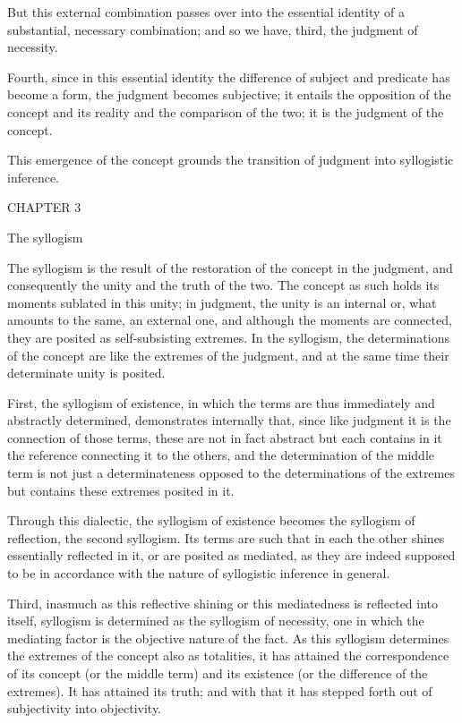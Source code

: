 But this external combination passes over
into the essential identity of a substantial, necessary combination;
and so we have, third, the judgment of necessity.

Fourth, since in this essential identity
the difference of subject and predicate has become a form,
the judgment becomes subjective;
it entails the opposition of the concept and its reality
and the comparison of the two;
it is the judgment of the concept.

This emergence of the concept grounds
the transition of judgment into syllogistic inference.

CHAPTER 3

The syllogism

The syllogism is the result of
the restoration of the concept in the judgment,
and consequently the unity and the truth of the two.
The concept as such holds its moments
sublated in this unity;
in judgment, the unity is an internal
or, what amounts to the same, an external one,
and although the moments are connected,
they are posited as self-subsisting extremes.
In the syllogism, the determinations of the concept
are like the extremes of the judgment,
and at the same time their determinate unity is posited.

First, the syllogism of existence,
in which the terms are thus
immediately and abstractly determined,
demonstrates internally that,
since like judgment it is
the connection of those terms,
these are not in fact abstract
but each contains in it the reference
connecting it to the others,
and the determination of the middle term is
not just a determinateness opposed to the
determinations of the extremes
but contains these extremes posited in it.

Through this dialectic,
the syllogism of existence becomes
the syllogism of reflection, the second syllogism.
Its terms are such that in each the other
shines essentially reflected in it,
or are posited as mediated,
as they are indeed supposed to be
in accordance with the nature of
syllogistic inference in general.

Third, inasmuch as this reflective shining
or this mediatedness is reflected into itself,
syllogism is determined as the syllogism of necessity,
one in which the mediating factor is
the objective nature of the fact.
As this syllogism determines the extremes
of the concept also as totalities,
it has attained the correspondence
of its concept (or the middle term)
and its existence (or the difference of the extremes).
It has attained its truth;
and with that it has stepped forth
out of subjectivity into objectivity.

